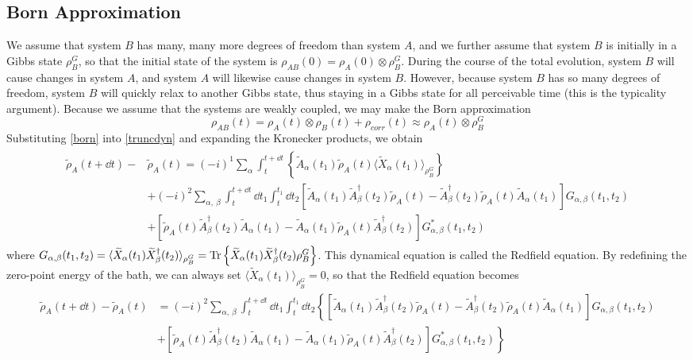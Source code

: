 \documentclass{article}
\newcommand{\ten}{\otimes}
\newcommand{\Tra}[1]{\Tr\left\{#1\right\}}
\newcommand{\til}[1]{\widetilde{#1}}
\newcommand{\ave}[2]{\langle #1\rangle_{#2}}
\begin{document}
\subsection{Born Approximation}

We assume that system $B$ has many, many more degrees of freedom than system $A$, and we further assume that system $B$ is initially in a Gibbs state $\rho_B^G$, so that the initial state of the system is $\rho_{AB}(0) = \rho_A(0)\ten\rho_B^G$. During the course of the total evolution, system $B$ will cause changes in system $A$, and system $A$ will likewise cause changes in system $B$. However, because system $B$ has so many degrees of freedom, system $B$ will quickly relax to another Gibbs state, thus staying in a Gibbs state for all perceivable time (this is the typicality argument). Because we assume that the systems are weakly coupled, we may make the Born approximation
\begin{equation}\label{born}
\rho_{AB}(t) = \rho_A(t)\ten\rho_B(t) + \rho_{corr}(t)\approx \rho_A(t)\ten\rho_B^G
\end{equation}
Substituting \ref{born} into \ref{truncdyn} and expanding the Kronecker products, we obtain
\begin{align}\label{fuckmyass}
\begin{split}
\til{\rho}_A(t+\dd{t})-&\til{\rho}_A(t) = (-i)^1\sum_{\alpha}\int_t^{t+\dd{t}} \left\{\til{A}_{\alpha}(t_1)\til{\rho}_A(t)\ave{\til{X}_{\alpha}(t_1)}{\rho_B^G}\right\}\\
&+(-i)^2\sum_{\alpha,\ \beta}\int_t^{t+\dd{t}}\dd{t_1}\int_t^{t_1}\dd{t_2}\left[\til{A}_{\alpha}(t_1)\til{A}_{\beta}^{\dag}(t_2)\til{\rho}_A(t)-\til{A}_{\beta}^{\dag}(t_2)\til{\rho}_A(t)\til{A}_{\alpha}(t_1)\right]G_{\alpha,\beta}(t_1,t_2)\\
&+\left[\til{\rho}_A(t)\til{A}_{\beta}^{\dag}(t_2)\til{A}_{\alpha}(t_1)-\til{A}_{\alpha}(t_1)\til{\rho}_A(t)\til{A}_{\beta}^{\dag}(t_2)\right]G_{\alpha,\beta}^{*}(t_1,t_2)
\end{split}
\end{align}
where $G_{\alpha,\beta}(t_1,t_2) =\ave{\til{X}_{\alpha}(t_1)\til{X}_{\beta}^{\dag}(t_2)}{\rho_B^G}= \Tra{\til{X}_{\alpha}(t_1)\til{X}_{\beta}^{\dag}(t_2)\rho_B^G}$. This dynamical equation is called the Redfield equation. By redefining the zero-point energy of the bath, we can always set $\ave{\til{X}_{\alpha}(t_1)}{\rho_B^G} = 0$, so that the Redfield equation becomes
\begin{align}\label{redfield}
\begin{split}
\til{\rho}_A(t+\dd{t})-\til{\rho}_A(t) &= (-i)^2\sum_{\alpha,\ \beta}\int_t^{t+\dd{t}}\dd{t_1}\int_t^{t_1}\dd{t_2}\left\{\left[\til{A}_{\alpha}(t_1)\til{A}_{\beta}^{\dag}(t_2)\til{\rho}_A(t)-\til{A}_{\beta}^{\dag}(t_2)\til{\rho}_A(t)\til{A}_{\alpha}(t_1)\right]G_{\alpha,\beta}(t_1,t_2)\right.\\
&\left.+\left[\til{\rho}_A(t)\til{A}_{\beta}^{\dag}(t_2)\til{A}_{\alpha}(t_1)-\til{A}_{\alpha}(t_1)\til{\rho}_A(t)\til{A}_{\beta}^{\dag}(t_2)\right]G_{\alpha,\beta}^{*}(t_1,t_2)\right\}
\end{split}
\end{align}
\end{document}
